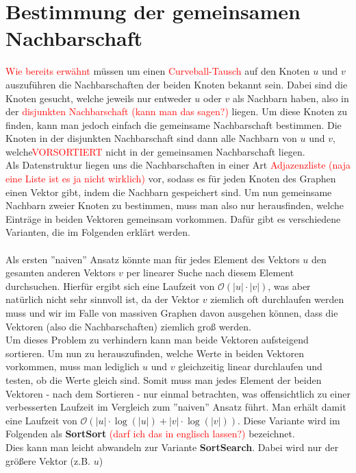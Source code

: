\documentclass[a4paper]{scrreprt}
\def\O{\mathcal{O}}
\theoremstyle{plain} %
\theoremstyle{definition} %
\begin{document}
\section{Bestimmung der gemeinsamen Nachbarschaft}
\textcolor{red}{Wie bereits erwähnt} müssen um einen \textcolor{red}{Curveball-Tausch} auf den Knoten $u$ und $v$
auszuführen die Nachbarschaften der beiden Knoten bekannt sein. Dabei sind die Knoten gesucht, 
welche jeweils nur entweder $u$ oder $v$ als Nachbarn haben, also in der \textcolor{red}{disjunkten Nachbarschaft (kann man das sagen?)} liegen.
Um diese Knoten zu finden, kann man jedoch einfach die gemeinsame Nachbarschaft bestimmen. Die Knoten
in der disjunkten Nachbarschaft sind dann alle Nachbarn von $u$ und $v$, welche\textcolor{red}{VORSORTIERT}
 nicht in der gemeinsamen
Nachbarschaft liegen. 
\\
Als Datenstruktur liegen uns die Nachbarschaften in einer Art \textcolor{red}{Adjazenzliste (naja eine Liste ist es ja nicht wirklich)}
vor, sodass es für jeden Knoten des Graphen einen Vektor gibt, indem die Nachbarn gespeichert sind.
Um nun gemeinsame Nachbarn
zweier Knoten zu bestimmen, muss man also nur herausfinden, welche Einträge in beiden Vektoren gemeinsam
vorkommen. Dafür gibt es verschiedene Varianten, die 
im Folgenden erklärt werden.
\\
\\
Als ersten ''naiven'' Ansatz könnte man für jedes Element des Vektors $u$ den gesamten anderen 
Vektors $v$ per linearer Suche nach diesem Element durchsuchen. Hierfür ergibt sich eine Laufzeit von
$\O(|u|\cdot|v|)$, was aber natürlich nicht sehr sinnvoll ist, da der Vektor $v$ ziemlich oft 
durchlaufen werden muss und wir 
im Falle von massiven Graphen davon ausgehen können, dass die Vektoren (also die Nachbarschaften)
ziemlich groß werden. 
\\
Um dieses Problem zu verhindern kann man beide Vektoren aufsteigend sortieren. Um nun zu herauszufinden,
welche Werte in beiden Vektoren vorkommen, muss man lediglich $u$ und $v$ gleichzeitig linear durchlaufen
und testen, ob die Werte gleich sind. Somit muss man jedes Element der beiden Vektoren - nach dem Sortieren - 
nur einmal betrachten, was offensichtlich zu einer verbesserten Laufzeit im Vergleich zum ''naiven''
Ansatz führt. Man erhält damit eine Laufzeit von $\O(|u|\cdot \log (|u|)  + |v|\cdot\log(|v|))$. 
Diese Variante wird im Folgenden als \textbf{SortSort} \textcolor{red}{(darf ich das in
englisch lassen?)} bezeichnet.
\\
Dies kann man leicht abwandeln zur Variante \textbf{SortSearch}. Dabei wird nur der größere Vektor (z.B. $u$)
\end{document}
